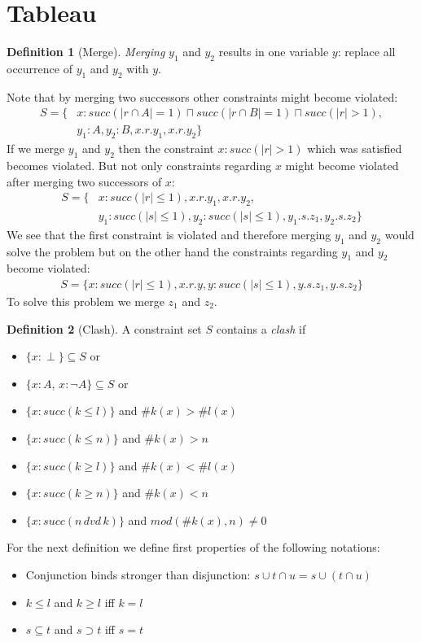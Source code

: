 \documentclass[a4paper,11pt]{scrartcl}
\theoremstyle{definition}
\newtheorem{mydef}{Definition}
\begin{document}
\section{Tableau}
\begin{mydef}[Merge]
\textit{Merging} $y_1$ and $y_2$ results in one variable $y$: replace all occurrence of $y_1$ and $y_2$ with $y$. 
\end{mydef}
Note that by merging two successors other constraints might become violated:
\begin{align}
S=\{&x:succ(|r\cap A|=1)\sqcap succ(|r\cap B|=1)\sqcap succ(|r|>1),\nonumber\\ &y_1:A, y_2:B, x.r.y_1, x.r.y_2\}
\end{align}
If we merge $y_1$ and $y_2$ then the constraint $x:succ(|r|>1)$ which was satisfied becomes violated. But not only constraints regarding $x$ might become violated after merging two successors of $x$: 
\begin{align}
S=\{&x:succ(|r|\leq 1), x.r.y_1, x.r.y_2,\nonumber
\\&y_1:succ(|s|\leq 1), y_2:succ(|s|\leq 1), y_1.s.z_1, y_2.s.z_2\}
\end{align}
We see that the first constraint is violated and therefore merging $y_1$ and $y_2$ would solve the problem but on the other hand the constraints regarding $y_1$ and $y_2$ become violated: 
\begin{align*}
S=\{x:succ(|r|\leq 1), x.r.y,
y:succ(|s|\leq 1), y.s.z_1, y.s.z_2\}
\end{align*}
To solve this problem we merge $z_1$ and $z_2$.
\begin{mydef}[Clash]
A constraint set $S$ contains a \textit{clash} if
\begin{itemize}
\item $\{x:\perp\}\subseteq S$ or
\item $\{x:A,\,x:\neg A\}\subseteq S$ or
\item $\{x:succ(k\leq l)\}$ and $\#k(x)>\#l(x)$
\item $\{x:succ(k\leq n)\}$ and $\#k(x)>n$
\item $\{x:succ(k\geq l)\}$ and $\#k(x)<\#l(x)$
\item $\{x:succ(k\geq n)\}$ and $\#k(x)<n$
\item $\{x:succ(n\, dvd\, k)\}$ and $mod(\#k(x),n)\neq 0$
\end{itemize}
\end{mydef}
For the next definition we define first properties of the following notations:
\begin{itemize}
\item Conjunction binds stronger than disjunction: $s\cup t\cap u = s\cup (t\cap u)$
\item $k\leq l$ and $k\geq l$ iff $k=l$
\item $s\subseteq t$ and $s\supset t$ iff $s=t$
\end{itemize}
\end{document}
